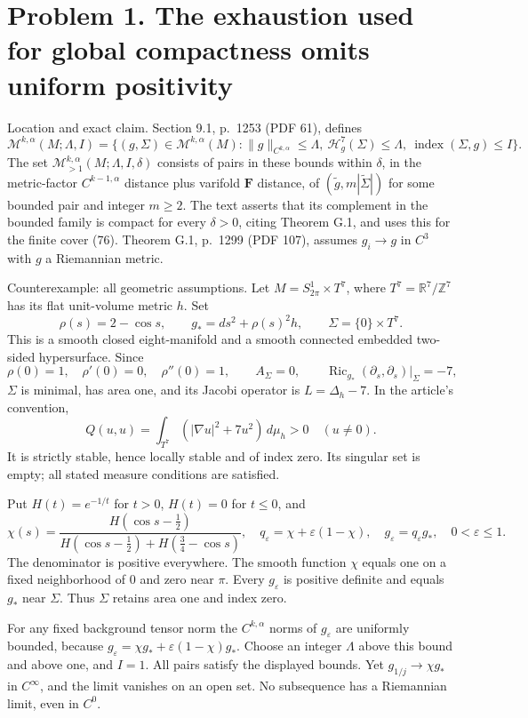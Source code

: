 \documentclass[10pt]{article}
\begin{document}
\section*{Problem 1. The exhaustion used for global compactness omits uniform positivity}
Location and exact claim. Section 9.1, p. 1253 (PDF 61), defines \[\mathcal M^{k,\alpha}(M;\Lambda,I)=
 \{(g,\Sigma)\in\mathcal M^{k,\alpha}(M):
 \|g\|_{C^{k,\alpha}}\leq\Lambda,\ 
 \mathcal H^7_g(\Sigma)\leq\Lambda,\ \operatorname{index}(\Sigma,g)\leq I\}.\] The set \(\mathcal M_{>1}^{k,\alpha}(M;\Lambda,I,\delta)\) consists of pairs in these bounds within \(\delta\), in the metric-factor \(C^{k-1,\alpha}\) distance plus varifold \(\mathbf F\) distance, of \((\widetilde g,m|\widetilde\Sigma|)\) for some bounded pair and integer \(m\geq2\). The text asserts that its complement in the bounded family is compact for every \(\delta>0\), citing Theorem G.1, and uses this for the finite cover (76). Theorem G.1, p. 1299 (PDF 107), assumes \(g_i\to g\) in \(C^3\) with \(g\) a Riemannian metric.\par
Counterexample: all geometric assumptions. Let \(M=S^1_{2\pi}\times T^7\), where \(T^7=\mathbb R^7/\mathbb Z^7\) has its flat unit-volume metric \(h\). Set \[\rho(s)=2-\cos s,\qquad
 g_* = ds^2+\rho(s)^2h,\qquad \Sigma=\{0\}\times T^7 .\] This is a smooth closed eight-manifold and a smooth connected embedded two-sided hypersurface. Since \[\rho(0)=1,\quad \rho'(0)=0,\quad \rho''(0)=1,
 \qquad A_\Sigma=0,\qquad
 \operatorname{Ric}_{g_*}(\partial_s,\partial_s)|_\Sigma=-7,\] \(\Sigma\) is minimal, has area one, and its Jacobi operator is \(L=\Delta_h-7\). In the article’s convention, \[Q(u,u)=\int_{T^7}(|\nabla u|^2+7u^2)\,d\mu_h>0
 \quad (u\ne0).\] It is strictly stable, hence locally stable and of index zero. Its singular set is empty; all stated measure conditions are satisfied.\par
Put \(H(t)=e^{-1/t}\) for \(t>0\), \(H(t)=0\) for \(t\leq0\), and \[\chi(s)=\frac{H(\cos s-\tfrac12)}
 {H(\cos s-\tfrac12)+H(\tfrac34-\cos s)},\quad
 q_\varepsilon=\chi+\varepsilon(1-\chi),\quad
 g_\varepsilon=q_\varepsilon g_*,\quad 0<\varepsilon\leq1.\] The denominator is positive everywhere. The smooth function \(\chi\) equals one on a fixed neighborhood of \(0\) and zero near \(\pi\). Every \(g_\varepsilon\) is positive definite and equals \(g_*\) near \(\Sigma\). Thus \(\Sigma\) retains area one and index zero.\par
For any fixed background tensor norm the \(C^{k,\alpha}\) norms of \(g_\varepsilon\) are uniformly bounded, because \(g_\varepsilon=\chi g_*+\varepsilon(1-\chi)g_*\). Choose an integer \(\Lambda\) above this bound and above one, and \(I=1\). All pairs satisfy the displayed bounds. Yet \(g_{1/j}\to\chi g_*\) in \(C^\infty\), and the limit vanishes on an open set. No subsequence has a Riemannian limit, even in \(C^0\).\par
\end{document}
